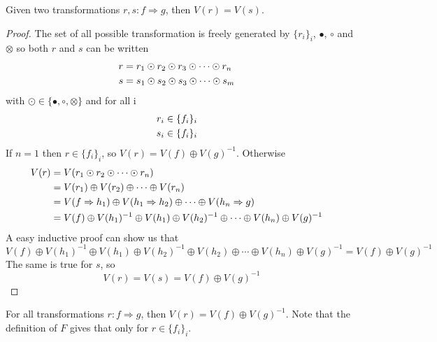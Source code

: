 \documentclass[a4paper]{article}
\begin{document}
\begin{proposition}
Given two transformations $r, s: f \Rightarrow g$, then $V(r) = V(s)$.

\begin{proof}
The set of all possible transformation is freely generated by $\{r_i\}_i$, $\bullet$, $\circ$ and $\otimes$ so both $r$ and $s$ can be written
\begin{align}
r &= r_1 \odot r_2 \odot r_3 \odot \cdots \odot r_n \cr
s &= s_1 \odot s_2 \odot s_3 \odot \cdots \odot s_m
\end{align}
with $\odot \in \{\bullet, \circ, \otimes\}$ and for all i
\begin{align}
r_i &\in \{f_i\}_i \cr
s_i &\in \{f_i\}_i
\end{align}
If $n = 1$ then $r \in \{f_i\}_i$, so $V(r) = V(f) \oplus V(g)^{-1}$.
Otherwise
\begin{align}
V(r) &= V(r_1 \odot r_2 \odot \cdots \odot r_n) \cr
&= V(r_1) \oplus V(r_2) \oplus \cdots \oplus V(r_n) \cr
&= V(f \Rightarrow h_1) \oplus V(h_1 \Rightarrow h_2) \oplus \cdots \oplus V(h_n \Rightarrow g) \cr
&= V(f) \oplus V(h_1)^{-1} \oplus V(h_1) \oplus V(h_2)^{-1} \oplus \cdots \oplus V(h_n) \oplus V(g)^{-1}
\end{align}
A easy inductive proof can show us that
\[
V(f) \oplus V(h_1)^{-1} \oplus V(h_1) \oplus V(h_2)^{-1} \oplus V(h_2) \oplus \cdots \oplus V(h_n) \oplus V(g)^{-1} = V(f) \oplus V(g)^{-1}
\]
The same is true for $s$, so
\[
V(r) = V(s) = V(f) \oplus V(g)^{-1}
\]
\end{proof}
\end{proposition}

\begin{corollary}
For all transformations $r: f \Rightarrow g$, then $V(r) = V(f) \oplus V(g)^{-1}$.
Note that the definition of $F$ gives that only for $r \in \{f_i\}_i$.
\end{corollary}
\end{document}
